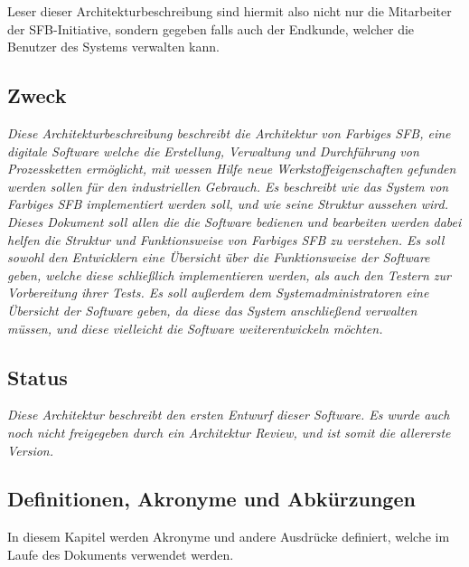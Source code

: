 \documentclass[enabledeprecatedfontcommands,fontsize=12pt,paper=a4,twoside]{scrartcl}
\begin{document}
Leser dieser Architekturbeschreibung sind hiermit also nicht nur die Mitarbeiter der SFB-Initiative, sondern gegeben falls auch der Endkunde, welcher die Benutzer des Systems verwalten kann.

\subsection{Zweck}

  {\em Diese Architekturbeschreibung beschreibt die Architektur von Farbiges SFB, eine digitale Software welche die Erstellung, Verwaltung und Durchführung von Prozessketten ermöglicht, mit wessen Hilfe neue Werkstoffeigenschaften gefunden werden sollen für den industriellen Gebrauch. Es beschreibt wie das System von Farbiges SFB  implementiert werden soll, und wie seine Struktur aussehen wird. 
Dieses Dokument soll allen die die Software bedienen und bearbeiten werden dabei helfen die Struktur und Funktionsweise von Farbiges SFB zu verstehen. Es soll sowohl den Entwicklern eine Übersicht über die Funktionsweise der Software geben, welche diese schließlich implementieren werden, als auch den Testern zur Vorbereitung  ihrer Tests. Es soll außerdem dem Systemadministratoren eine Übersicht der Software geben, da diese das System anschließend verwalten müssen, und diese vielleicht die Software weiterentwickeln möchten. 
}

\subsection{Status}

{\em Diese Architektur beschreibt den ersten Entwurf dieser Software. Es wurde auch noch nicht freigegeben durch ein Architektur Review, und ist somit die allererste Version.  }



\subsection{Definitionen, Akronyme und Abkürzungen}
In diesem Kapitel werden Akronyme und andere Ausdrücke definiert, welche im Laufe des Dokuments verwendet werden.
\end{document}
